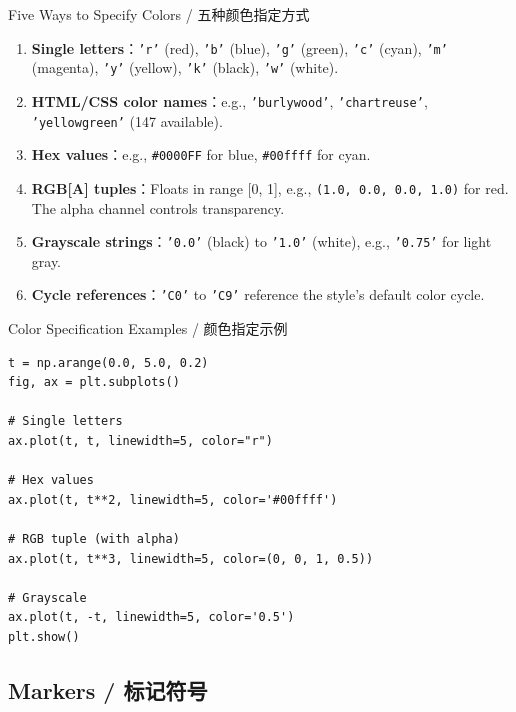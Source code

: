 \documentclass[11pt,a4paper]{report}
\let\oldtexttt\texttt
\renewcommand{\texttt}[1]{\textcolor{mainblue}{\oldtexttt{#1}}}
\begin{document}
\begin{concept}{Five Ways to Specify Colors / 五种颜色指定方式}
    \begin{enumerate}[itemsep=0.3em]
        \item \textbf{Single letters}：\texttt{'r'} (red), \texttt{'b'} (blue), \texttt{'g'} (green), \texttt{'c'} (cyan), \texttt{'m'} (magenta), \texttt{'y'} (yellow), \texttt{'k'} (black), \texttt{'w'} (white).
        \item \textbf{HTML/CSS color names}：e.g., \texttt{'burlywood'}, \texttt{'chartreuse'}, \texttt{'yellowgreen'} (147 available).
        \item \textbf{Hex values}：e.g., \texttt{\#0000FF} for blue, \texttt{\#00ffff} for cyan.
        \item \textbf{RGB[A] tuples}：Floats in range [0, 1], e.g., \texttt{(1.0, 0.0, 0.0, 1.0)} for red. The alpha channel controls transparency.
        \item \textbf{Grayscale strings}：\texttt{'0.0'} (black) to \texttt{'1.0'} (white), e.g., \texttt{'0.75'} for light gray.
        \item \textbf{Cycle references}：\texttt{'C0'} to \texttt{'C9'} reference the style's default color cycle.
    \end{enumerate}
\end{concept}

\begin{examplebox}{Color Specification Examples / 颜色指定示例}
\begin{lstlisting}
t = np.arange(0.0, 5.0, 0.2)
fig, ax = plt.subplots()

# Single letters
ax.plot(t, t, linewidth=5, color="r")

# Hex values
ax.plot(t, t**2, linewidth=5, color='#00ffff')

# RGB tuple (with alpha)
ax.plot(t, t**3, linewidth=5, color=(0, 0, 1, 0.5))

# Grayscale
ax.plot(t, -t, linewidth=5, color='0.5')
plt.show()
\end{lstlisting}
\end{examplebox}

\subsection{Markers / 标记符号}
\end{document}
